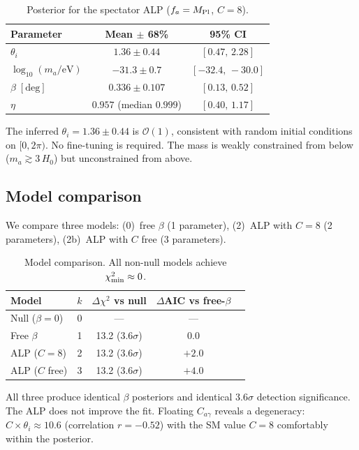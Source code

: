 \documentclass[aps,prd,twocolumn,superscriptaddress,showpacs,preprintnumbers,nofootinbib,longbibliography,floatfix]{revtex4-2}
\newcommand{\MPl}{M_{\rm Pl}}
\begin{document}
\begin{table}[h]
\centering
\caption{Posterior for the spectator ALP ($f_a = \MPl$, $C = 8$).}
\label{tab:mcmc}
\begin{tabular}{lcc}
\hline\hline
Parameter & Mean $\pm$ 68\% & 95\% CI \\
\hline
$\theta_i$ & $1.36 \pm 0.44$ & $[0.47,\, 2.28]$ \\
$\log_{10}(m_a/\mathrm{eV})$ & $-31.3 \pm 0.7$ & $[-32.4,\, -30.0]$ \\
$\beta\;[\mathrm{deg}]$ & $0.336 \pm 0.107$ & $[0.13,\, 0.52]$ \\
$\eta$ & $0.957$ (median $0.999$) & $[0.40,\, 1.17]$ \\
\hline\hline
\end{tabular}
\end{table}

\noindent The inferred $\theta_i = 1.36 \pm 0.44$ is $\mathcal{O}(1)$,
consistent with random initial conditions on $[0,2\pi)$.  No fine-tuning is
required.  The mass is weakly constrained from below
($m_a \gtrsim 3\,H_0$) but unconstrained from above.

\subsection{Model comparison}\label{sec:model_comparison}

We compare three models: (0)~free $\beta$ (1 parameter),
(2)~ALP with $C = 8$ (2 parameters), (2b)~ALP with $C$ free (3 parameters).

\begin{table}[h]
\centering
\caption{Model comparison.  All non-null models achieve
  $\chi^2_{\rm min} \approx 0$.}
\label{tab:model_comp}
\begin{tabular}{lcccc}
\hline\hline
Model & $k$ & $\Delta\chi^2$ vs null & $\Delta$AIC vs free-$\beta$ \\
\hline
Null ($\beta = 0$) & 0 & --- & --- \\
Free $\beta$ & 1 & 13.2 ($3.6\sigma$) & 0.0 \\
ALP ($C{=}8$) & 2 & 13.2 ($3.6\sigma$) & $+2.0$ \\
ALP ($C$ free) & 3 & 13.2 ($3.6\sigma$) & $+4.0$ \\
\hline\hline
\end{tabular}
\end{table}

All three produce identical $\beta$ posteriors and identical
$3.6\sigma$ detection significance.  The ALP does not improve the fit.
Floating $C_{a\gamma}$ reveals a degeneracy: $C \times \theta_i \approx 10.6$
(correlation $r = -0.52$) with the SM value $C = 8$ comfortably within the
posterior.
\end{document}
